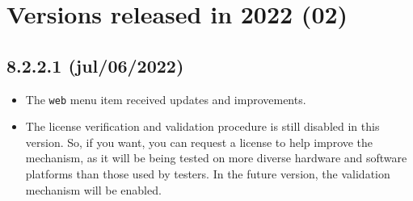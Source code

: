 
\hypertarget{2022}{}
\section{Versions released in 2022 (02)}

\subsection*{8.2.2.1 (jul/06/2022)}
\begin{itemize}
  \item The \texttt{web} menu item received updates and improvements.
  \item The license verification and validation procedure is still disabled in this version.
    So, if you want, you can request a license to help improve the mechanism,
    as it will be being tested on more diverse hardware and software platforms than
    those used by testers. In the future version, the validation mechanism will be enabled.
\end{itemize}

